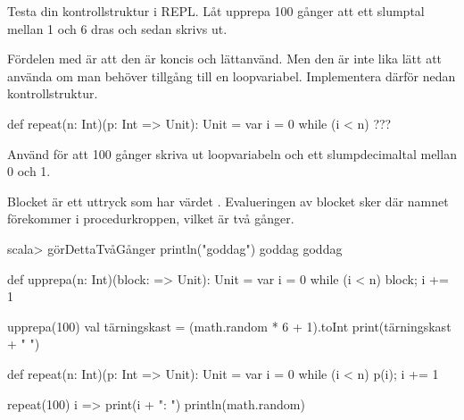 \Subtask
Testa din kontrollstruktur i REPL. Låt upprepa 100 gånger att ett slumptal mellan 1 och 6 dras och sedan skrivs ut.

\Subtask Fördelen med  är att den är koncis och lättanvänd. Men den är inte lika lätt att använda om man behöver tillgång till en loopvariabel. Implementera därför nedan kontrollstruktur.

\begin{Code}
def repeat(n: Int)(p: Int => Unit): Unit = {
   var i = 0
   while (i < n) { ??? }
}
\end{Code}

\Subtask Använd  för att 100 gånger skriva ut loopvariabeln och ett slumpdecimaltal mellan 0 och 1.


\SOLUTION

\TaskSolved \what

\SubtaskSolved Blocket är ett uttryck som har värdet . Evalueringen av blocket sker där namnet  förekommer i procedurkroppen, vilket är två gånger.
\begin{REPL}
scala> görDettaTvåGånger { println("goddag") }
goddag
goddag
\end{REPL}

\SubtaskSolved
\begin{Code}
def upprepa(n: Int)(block: => Unit): Unit = {
   var i = 0
   while (i < n) {block; i += 1}
}
\end{Code}

\SubtaskSolved
\begin{Code}
upprepa(100){
  val tärningskast = (math.random * 6 + 1).toInt
  print(tärningskast + " ")
}
\end{Code}


\SubtaskSolved
\begin{Code}
def repeat(n: Int)(p: Int => Unit): Unit = {
   var i = 0
   while (i < n) {p(i); i += 1}
}
\end{Code}

\SubtaskSolved
\begin{Code}
repeat(100){ i =>
  print(i + ": ")
  println(math.random)
}
\end{Code}



\QUESTEND
